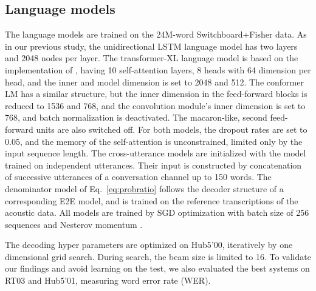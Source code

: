 \documentclass[a4paper]{article}
\begin{document}
\vspace{-1mm}
\subsection{Language models}
\vspace{-1mm}
The language models are trained on the 24M-word Switchboard+Fisher data.
As in our previous study, the unidirectional LSTM language model has two layers and 2048 nodes per layer.
The transformer-XL language model is based on the implementation of \cite{nvidiaXl,dai2019},
having 10 self-attention layers, 8 heads with 64 dimension per head, and the inner and model dimension is set to 2048 and 512.
The conformer LM has a similar structure, but the inner dimension in the feed-forward blocks is reduced to 1536 and 768, and the convolution module's inner dimension is set to 768, and batch normalization is deactivated.
The macaron-like, second feed-forward units are also switched off.
For both models, the dropout rates are set to 0.05, and the memory of the self-attention is unconstrained, limited only by the input sequence length.
The cross-utterance models are initialized with the model trained on independent utterances.
Their input is constructed by concatenation of successive utterances of a conversation channel up to 150 words.
The denominator model of Eq.~\ref{eq:probratio} follows the decoder structure of a corresponding E2E model, and is trained on the reference transcriptions of the acoustic data.
All models are trained by SGD optimization with batch size of 256 sequences and Nesterov momentum \cite{nesterov1983}.

The decoding hyper parameters are optimized on Hub5'00, iteratively by one dimensional grid search.
During search, the beam size is limited to 16.
To validate our findings and avoid learning on the test, we also evaluated the best systems on RT03 and Hub5'01, measuring word error rate (WER).
\end{document}
